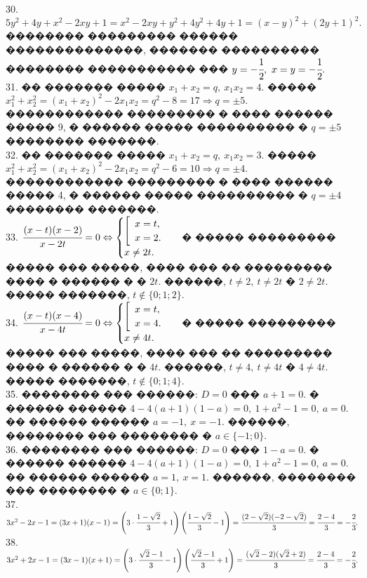 \documentclass[12pt]{article}
\begin{document}
30. $5y^2+4y+x^2-2xy+1=x^2-2xy+y^2+4y^2+4y+1=(x-y)^2+(2y+1)^2.$ �������� ��������� ������ ��������������, ������� ���������� �������� ����������� ��� $y=-\cfrac{1}{2},\ x=y=-\cfrac{1}{2}.$\\
31. �� ������� ����� $x_1+x_2=q,\ x_1x_2=4.$ ����� $x_1^2+x_2^2=(x_1+x_2)^2-2x_1x_2=q^2-8=17\Rightarrow q=\pm5.$ ������������ ��������� � ���� ������ ����� 9, � ������ ����� ���������� � $q=\pm5$ �������� �������.\\
32. �� ������� ����� $x_1+x_2=q,\ x_1x_2=3.$ ����� $x_1^2+x_2^2=(x_1+x_2)^2-2x_1x_2=q^2-6=10\Rightarrow q=\pm4.$ ������������ ��������� � ���� ������ ����� 4, � ������ ����� ���������� � $q=\pm4$ �������� �������.\\
33. $\cfrac{(x-t)(x-2)}{x-2t}=0\Leftrightarrow\begin{cases}\left[\begin{array}{l}x=t,\\ x=2.\end{array}\right.\\x\neq2t.\end{cases}$ � ����� ��������� ����� ��� �����, ���� ��� �� ��������� ���� � ������ � � $2t.$ ������, $t\neq2,\ t\neq2t$ � $2\neq2t.$ ����� �������, $t\notin\{0; 1; 2\}.$\\
34. $\cfrac{(x-t)(x-4)}{x-4t}=0\Leftrightarrow\begin{cases}\left[\begin{array}{l}x=t,\\ x=4.\end{array}\right.\\x\neq4t.\end{cases}$ � ����� ��������� ����� ��� �����, ���� ��� �� ��������� ���� � ������ � � $4t.$ ������, $t\neq4,\ t\neq4t$ � $4\neq4t.$ ����� �������, $t\notin\{0; 1; 4\}.$\\
35. �������� ��� ������: $D=0$ ��� $a+1=0.$ � ������ ������ $4-4(a+1)(1-a)=0,\ 1+a^2-1=0,\ a=0.$ �� ������ ������ $a=-1,\ x=-1.$ ������, �������� ��� �������� � $a\in\{-1;0\}.$\\
36. �������� ��� ������: $D=0$ ��� $1-a=0.$ � ������ ������ $4-4(a+1)(1-a)=0,\ 1+a^2-1=0,\ a=0.$ �� ������ ������ $a=1,\ x=1.$ ������, �������� ��� �������� � $a\in\{0;1\}.$\\
37. $3x^2-2x-1=(3x+1)(x-1)=\left(3\cdot\cfrac{1-\sqrt{2}}{3}+1\right)\left(\cfrac{1-\sqrt{2}}{3}-1\right)=\cfrac{(2-\sqrt{2})(-2-\sqrt{2})}{3}=\cfrac{2-4}{3}=-\cfrac{2}{3}.$\\
38. $3x^2+2x-1=(3x-1)(x+1)=\left(3\cdot\cfrac{\sqrt{2}-1}{3}-1\right)\left(\cfrac{\sqrt{2}-1}{3}+1\right)=\cfrac{(\sqrt{2}-2)(\sqrt{2}+2)}{3}=\cfrac{2-4}{3}=-\cfrac{2}{3}.$\\
\end{document}

